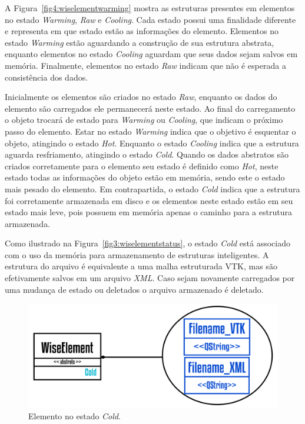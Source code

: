 A Figura~\ref{fig4:wiselementwarming} mostra as estruturas presentes em elementos no estado \textit{Warming}, \textit{Raw} e \textit{Cooling}. Cada estado possui uma finalidade diferente e representa em que estado estão as informações do elemento. Elementos no estado \textit{Warming} estão aguardando a construção de sua estrutura abstrata, enquanto elementos  no estado \textit{Cooling} aguardam que seus dados sejam salvos em memória. Finalmente, elementos no estado \textit{Raw} indicam que não é esperada a consistência dos dados.

Inicialmente os elementos são criados no estado \textit{Raw}, enquanto os dados do elemento são carregados ele permanecerá neste estado. Ao final do carregamento o objeto trocará de estado para \textit{Warming} ou \textit{Cooling}, que indicam o próximo passo do elemento. Estar no estado \textit{Warming} indica que o objetivo é esquentar o objeto, atingindo o estado \textit{Hot}. Enquanto o estado \textit{Cooling} indica que a estrutura aguarda resfriamento, atingindo o estado \textit{Cold}. Quando os dados abstratos são criados corretamente para o elemento seu estado é definido como \textit{Hot}, neste estado todas as informações do objeto estão em memória, sendo este o estado mais pesado do elemento. Em contrapartida, o estado \textit{Cold} indica que a estrutura foi corretamente armazenada em disco e os elementos neste estado estão em seu estado mais leve, pois possuem em memória apenas o caminho para a estrutura armazenada.

Como ilustrado na Figura~\ref{fig3:wiselementstatus}, o estado \textit{Cold} está associado com o uso da memória para armazenamento de estruturas inteligentes. A estrutura do arquivo é equivalente a uma malha estruturada VTK, mas são efetivamente salvos em um arquivo \textit{XML}. Caso sejam novamente carregados por uma mudança de estado ou deletados o arquivo armazenado é deletado. 

\begin{figure}[!htbp]
	\centering
	\includegraphics[scale=1.85]{Figures/WiseElementCold@16x.png}
	\caption{Elemento no estado \textit{Cold}.}
	\label{fig5:wiselementcold}
\end{figure}

